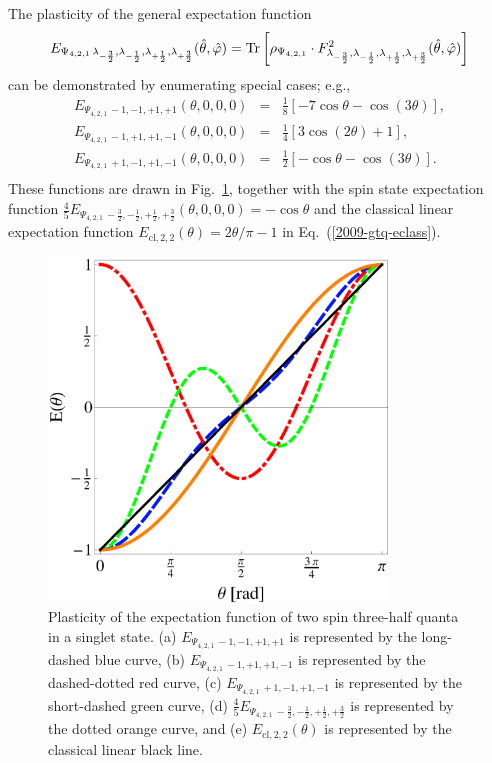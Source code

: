 \documentclass[pra,amsfonts,showpacs,showkeys,preprint]{revtex4}
\begin{document}
The plasticity of the general expectation function
\begin{equation}
E_{{ \Psi_{4,2,1}}\,\lambda_{-\frac{3}{2}},\lambda_{-\frac{1}{2}}, \lambda_{+\frac{1}{2}}, \lambda_{+\frac{3}{2}} } ({\hat \theta},{\hat \varphi} )
=
{\rm Tr}\left[ \rho_{ \Psi_{4,2,1}} \cdot  F^2_{\lambda_{-\frac{3}{2}},\lambda_{-\frac{1}{2}}, \lambda_{+\frac{1}{2}}, \lambda_{+\frac{3}{2}} } ({\hat \theta},{\hat \varphi})\right]
\label{2009-gtq-gpe4}
\end{equation}
can be demonstrated by enumerating special cases; e.g.,
\begin{equation}
\begin{array}{rcl}
E_{{ \Psi_{4,2,1}}\,-1,-1, +1, +1 } ( \theta ,0,0,0 )
&=& \frac{1}{8} \left[-7 \cos \theta -\cos (3 \theta )\right]
,
\\
E_{{ \Psi_{4,2,1}}\,-1,+1, +1, -1 } ( \theta ,0,0,0 )
&=& \frac{1}{4} \left[3 \cos (2 \theta )+1\right]
,
\\
E_{{ \Psi_{4,2,1}}\,+1,-1, +1, -1 } ( \theta ,0,0,0 )
&=& \frac{1}{2} \left[-\cos \theta -\cos (3 \theta )\right]
.
\\
\end{array}
\label{2009-gtq-e4-plast}
\end{equation}
These functions are drawn in Fig.~\ref{2009-gtq-gr4},
together with the spin state expectation function
$\frac{4}{5}E_{{ \Psi_{4,2,1}}\,-\frac{3}{2},-\frac{1}{2}, +\frac{1}{2}, +\frac{3}{2} }
( \theta ,0,0,0 ) = -\cos \theta $
and the classical linear expectation function
$E_{\text{cl},2,2}(\theta ) = {2 \theta / \pi} - 1$
in Eq.~(\ref{2009-gtq-eclass}).
\begin{figure}[htbp]
  \centering
\includegraphics[width=90mm]{2009-gtq-gr4}
\caption{Plasticity of the expectation function of two spin three-half quanta in a singlet state.
(a) $E_{{ \Psi_{4,2,1}}\,-1,-1, +1, +1 }$ is represented by the long-dashed blue curve,
(b) $E_{{ \Psi_{4,2,1}}\,-1,+1, +1, -1  }$ is represented by the dashed-dotted red curve,
(c) $E_{{ \Psi_{4,2,1}}\,+1,-1, +1, -1  }$ is represented by the short-dashed green curve,
(d) $\frac{4}{5}E_{{ \Psi_{4,2,1}}\,-\frac{3}{2},-\frac{1}{2}, +\frac{1}{2}, +\frac{3}{2} }$ is represented by the dotted orange curve,
and (e) $E_{\text{cl},2,2}(\theta )$ is represented by the classical linear  black line.
}
\label{2009-gtq-gr4}
\end{figure}
\end{document}
